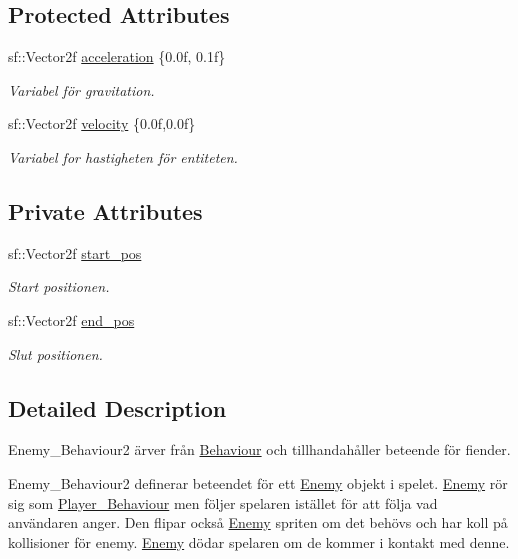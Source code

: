 \subsection*{Protected Attributes}
\begin{DoxyCompactItemize}
\item 
sf\+::\+Vector2f \hyperlink{classBehaviour_ac17cf81ceee6a44e8a8ec6ee810c9fd3}{acceleration} \{0.\+0f, 0.\+1f\}
\begin{DoxyCompactList}\small\item\em Variabel för gravitation. \end{DoxyCompactList}\item 
sf\+::\+Vector2f \hyperlink{classBehaviour_a1d52096cf20a59890f7705acbaccf88a}{velocity} \{0.\+0f,0.\+0f\}
\begin{DoxyCompactList}\small\item\em Variabel for hastigheten för entiteten. \end{DoxyCompactList}\end{DoxyCompactItemize}
\subsection*{Private Attributes}
\begin{DoxyCompactItemize}
\item 
sf\+::\+Vector2f \hyperlink{classEnemy2__Behaviour_a8adc028fa38366e2e7d204f7da84e34c}{start\+\_\+pos}
\begin{DoxyCompactList}\small\item\em Start positionen. \end{DoxyCompactList}\item 
sf\+::\+Vector2f \hyperlink{classEnemy2__Behaviour_ada807c200f4c5fc5a732d8ada274520a}{end\+\_\+pos}
\begin{DoxyCompactList}\small\item\em Slut positionen. \end{DoxyCompactList}\end{DoxyCompactItemize}


\subsection{Detailed Description}
Enemy\+\_\+\+Behaviour2 ärver från \hyperlink{classBehaviour}{Behaviour} och tillhandahåller beteende för fiender. 

Enemy\+\_\+\+Behaviour2 definerar beteendet för ett \hyperlink{classEnemy}{Enemy} objekt i spelet. \hyperlink{classEnemy}{Enemy} rör sig som \hyperlink{classPlayer__Behaviour}{Player\+\_\+\+Behaviour} men följer spelaren istället för att följa vad användaren anger. Den flipar också \hyperlink{classEnemy}{Enemy} spriten om det behövs och har koll på kollisioner för enemy. \hyperlink{classEnemy}{Enemy} dödar spelaren om de kommer i kontakt med denne.


